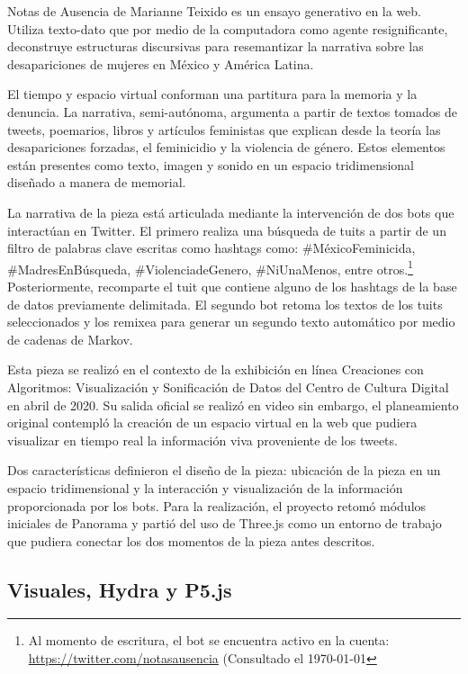 Notas de Ausencia de Marianne Teixido  es un ensayo generativo en la web. Utiliza texto-dato que por medio de la computadora como agente resignificante, deconstruye estructuras discursivas para resemantizar la narrativa sobre las desapariciones de mujeres en México y América Latina.

El tiempo y espacio virtual conforman una partitura para la memoria y la denuncia. La narrativa, semi-autónoma, argumenta a partir de textos tomados de tweets, poemarios, libros y artículos feministas que explican desde la teoría las desapariciones forzadas, el feminicidio y la violencia de género. Estos elementos están presentes como texto, imagen y sonido en un espacio tridimensional diseñado a manera de memorial.

La narrativa de la pieza está articulada mediante la intervención de dos bots que interactúan en Twitter. El primero realiza una búsqueda de tuits a partir de un filtro de palabras clave escritas como hashtags como: \#MéxicoFeminicida, \#MadresEnBúsqueda, \#ViolenciadeGenero, \#NiUnaMenos, entre otros.\footnote{Al momento de escritura, el bot se encuentra activo en la cuenta: \url{https://twitter.com/notasausencia} (Consultado el \today} Posteriormente, recomparte el tuit que contiene alguno de los hashtags de la base de datos previamente delimitada. El segundo bot retoma los textos de los tuits seleccionados y los remixea para generar un segundo texto automático por medio de cadenas de Markov.

Esta pieza se realizó en el contexto de la exhibición en línea Creaciones con Algoritmos: Visualización y Sonificación de Datos del Centro de Cultura Digital en abril de 2020. Su salida oficial se realizó en video sin embargo, el planeamiento original contempló la creación de un espacio virtual en la web que pudiera visualizar en tiempo real la información viva proveniente de los tweets.

Dos características definieron el diseño de la pieza: ubicación de la pieza en un espacio tridimensional y la interacción y visualización de la información proporcionada por los bots. Para la realización, el proyecto retomó módulos iniciales de Panorama y partió del uso de Three.js como un entorno de trabajo que pudiera conectar los dos momentos de la pieza antes descritos.

\subsection{Visuales, Hydra y P5.js}

